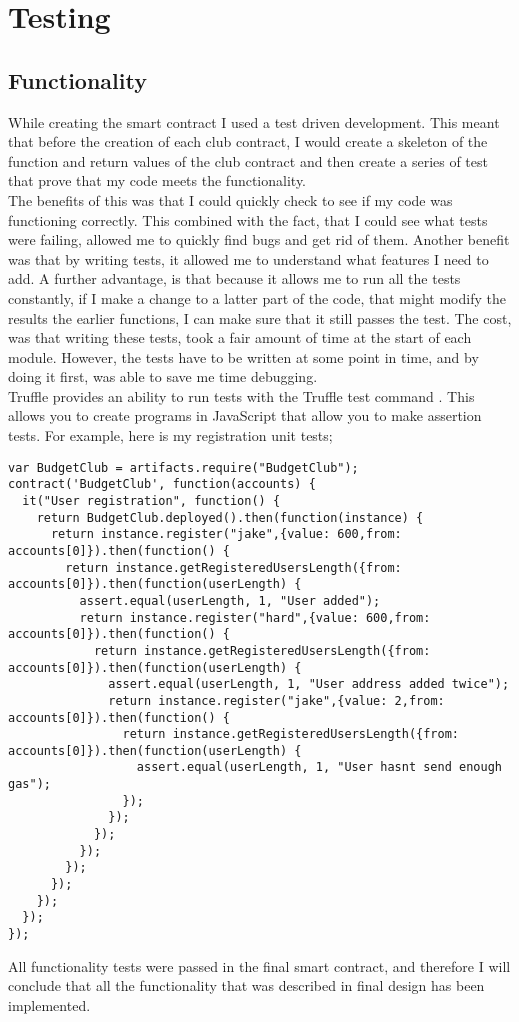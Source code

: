 \chapter{Testing} \label{Chapter: Testing}
\section{Functionality}
While creating the smart contract I used a test driven development. This meant that before the creation of each club contract, I would create a skeleton of the function and return values of the club contract and then create a series of test that prove that my code meets the functionality. \\
The benefits of this was that I could quickly check to see if my code was functioning correctly. This combined with the fact, that I could see what tests were failing, allowed me to quickly find bugs and get rid of them. Another benefit was that by writing tests, it allowed me to understand what features I need to add. A further advantage, is that because it allows me to run all the tests constantly, if I make a change to a latter part of the code, that might modify the results the earlier functions, I can make sure that it still passes the test. The cost, was that writing these tests, took a fair amount of time at the start of each module. However, the tests have to be written at some point in time, and by doing it first, was able to save me time debugging.\\
Truffle provides an ability to run tests with the Truffle test command \citep{truffletest:2018:pdflatex}. This allows you to create programs in JavaScript that allow you to make assertion tests. For example, here is my registration unit tests;
\begin{lstlisting}
var BudgetClub = artifacts.require("BudgetClub");
contract('BudgetClub', function(accounts) {
  it("User registration", function() {
    return BudgetClub.deployed().then(function(instance) {
      return instance.register("jake",{value: 600,from: accounts[0]}).then(function() {
        return instance.getRegisteredUsersLength({from: accounts[0]}).then(function(userLength) {
          assert.equal(userLength, 1, "User added");
          return instance.register("hard",{value: 600,from: accounts[0]}).then(function() {
            return instance.getRegisteredUsersLength({from: accounts[0]}).then(function(userLength) {
              assert.equal(userLength, 1, "User address added twice");
              return instance.register("jake",{value: 2,from: accounts[0]}).then(function() {
                return instance.getRegisteredUsersLength({from: accounts[0]}).then(function(userLength) {
                  assert.equal(userLength, 1, "User hasnt send enough gas");
                });
              });
            });
          });
        });
      });
    });
  });
});
\end{lstlisting}
All functionality tests were passed in the final smart contract, and therefore I will conclude that all the functionality that was described in final design has been implemented.
